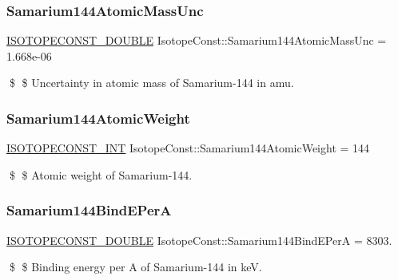 \subsubsection{\texorpdfstring{Samarium144\+Atomic\+Mass\+Unc}{Samarium144AtomicMassUnc}}
{\footnotesize\ttfamily \mbox{\hyperlink{group___isotope_const-_macros_ga8f45a7272ce02c0b4c65c44636ed719a}{I\+S\+O\+T\+O\+P\+E\+C\+O\+N\+S\+T\+\_\+\+D\+O\+U\+B\+LE}} Isotope\+Const\+::\+Samarium144\+Atomic\+Mass\+Unc = 1.\+668e-\/06}

\$ \$ Uncertainty in atomic mass of Samarium-\/144 in amu. \mbox{\label{group___isotope_const-_samarium-_sm144_ga36c1860d3a86cd8863dc6983ff2bdd6f}} 
\subsubsection{\texorpdfstring{Samarium144\+Atomic\+Weight}{Samarium144AtomicWeight}}
{\footnotesize\ttfamily \mbox{\hyperlink{group___isotope_const-_macros_ga5f18360b3e99483a35c32d789e62621c}{I\+S\+O\+T\+O\+P\+E\+C\+O\+N\+S\+T\+\_\+\+I\+NT}} Isotope\+Const\+::\+Samarium144\+Atomic\+Weight = 144}

\$ \$ Atomic weight of Samarium-\/144. \mbox{\label{group___isotope_const-_samarium-_sm144_ga17b76c5c526101c918751b6f15fde2f4}} 
\subsubsection{\texorpdfstring{Samarium144\+Bind\+E\+PerA}{Samarium144BindEPerA}}
{\footnotesize\ttfamily \mbox{\hyperlink{group___isotope_const-_macros_ga8f45a7272ce02c0b4c65c44636ed719a}{I\+S\+O\+T\+O\+P\+E\+C\+O\+N\+S\+T\+\_\+\+D\+O\+U\+B\+LE}} Isotope\+Const\+::\+Samarium144\+Bind\+E\+PerA = 8303.}

\$ \$ Binding energy per A of Samarium-\/144 in keV. \mbox{\label{group___isotope_const-_samarium-_sm144_ga2255039ff21fd7a5a99e8f098f54ea11}} 
